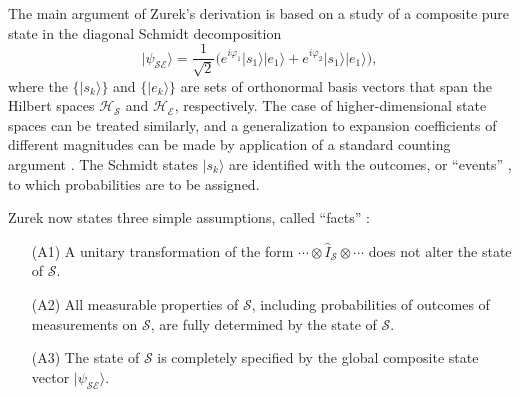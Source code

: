 \documentclass[rmp,aps,amsmath,amsfonts,noshowkeys,noshowpacs,12pt]{revtex4}
\newcommand{\ket}[1]{\ensuremath{|{#1\rangle}}}
\begin{document}
The main argument of Zurek's derivation is based on a study of a
composite pure state in the diagonal Schmidt decomposition
%
\begin{equation} \label{eq:schmidt}
\ket{\psi_\mathcal{SE}} = \frac{1}{\sqrt{2}} \big( e^{i\varphi_1} \ket{s_1} \ket{e_1}
+ e^{i\varphi_2} \ket{s_1} \ket{e_1} \big),
\end{equation}
%
where the $\{\ket{s_k}\}$ and $\{\ket{e_k}\}$ are sets of orthonormal
basis vectors that span the Hilbert spaces $\mathcal{H}_\mathcal{S}$
and $\mathcal{H}_\mathcal{E}$, respectively.  The case of
higher-dimensional state spaces can be treated similarly, and a
generalization to expansion coefficients of different magnitudes can be
made by application of a standard counting argument
\citep{Zurek:2003:rv,Zurek:2004:yb}.  The Schmidt states $\ket{s_k}$
are identified with the outcomes, or ``events''
\citep[][p.~12]{Zurek:2003:pl}, to which probabilities are to be
assigned.

Zurek now states three simple assumptions, called ``facts''
\citetext{\citealp{Zurek:2004:yb}, p.~4; see also the discussion in
  \citealp{Schlosshauer:2003:ms}}:

\begin{enumerate}

\item[(A1)] A unitary transformation of the form $\cdots \otimes
  \widehat{I}_\mathcal{S} \otimes \cdots$ does not alter the state of
  $\mathcal{S}$.
  
\item[(A2)] All measurable properties of $\mathcal{S}$, including
  probabilities of outcomes of measurements on $\mathcal{S}$, are
  fully determined by the state of $\mathcal{S}$.
  
\item[(A3)] The state of $\mathcal{S}$ is completely specified by the global
  composite state vector $\ket{\psi_\mathcal{SE}}$.

\end{enumerate}
\end{document}
